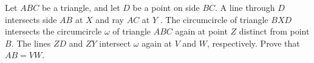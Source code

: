 Let $ABC$ be a triangle, and let $D$ be a point on side $BC$. A line through $D$ intersects side $AB$ at $X$ and ray $AC$ at $Y$ . The circumcircle of triangle $BXD$ intersects the circumcircle $\omega$ of triangle $ABC$ again at point $Z$ distinct from point $B$. The lines $ZD$ and $ZY$ intersect $\omega$ again at $V$ and $W$, respectively. Prove that $AB = V W$.